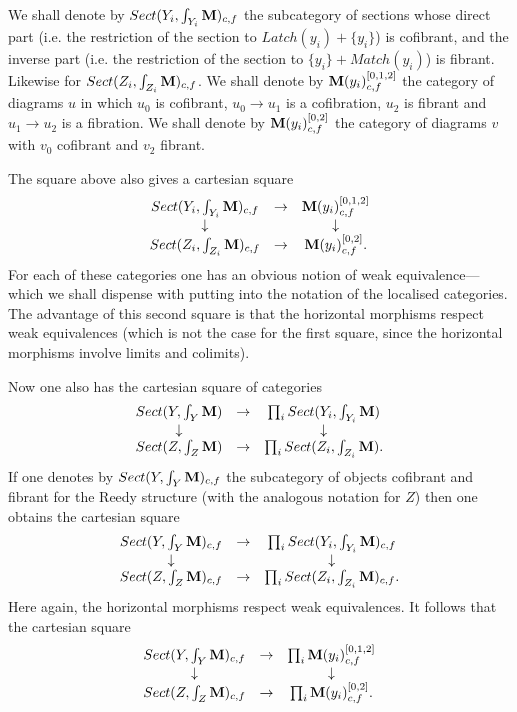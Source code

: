 We shall denote by $Sect (Y_i,\int _{Y_i}{\bf M} )_{c,f}$ the subcategory of
sections
whose direct part (i.e. the restriction of the section to $Latch(y_i)+\{
y_i\}$) is cofibrant, and the inverse part (i.e. the restriction of the
section
to $\{ y_i\} +Match(y_i)$) is fibrant. Likewise for
$Sect (Z_i,\int _{Z_i}{\bf M} )_{c,f}$. We shall denote by ${\bf M} (y_i) ^{[0,1,2]}_{c,f}$
the category of diagrams $u$ in which
$u_0$ is cofibrant, $u_0\rightarrow u_1$ is
a cofibration, $u_2$ is fibrant and $u_1\rightarrow u_2$
is a fibration. We
shall denote by ${\bf M} (y_i) ^{[0,2]}_{c,f}$ the category of diagrams $v$ with
$v_0$
cofibrant and $v_2$ fibrant.

The square above also gives a cartesian square
$$
\begin{array}{ccc}
Sect (Y_i,\int _{Y_i}{\bf M} ) _{c,f}& \rightarrow & {\bf M} (y_i) ^{[0,1,2]} _{c,f}\\
\downarrow && \downarrow \\
Sect (Z_i,\int _{Z_i}{\bf M} )  _{c,f}& \rightarrow & {\bf M} (y_i) ^{[0,2]} _{c,f}.
\end{array}
$$
For each of these categories one has an obvious notion of weak
equivalence---which we shall dispense with putting into the notation of the
localised categories. The advantage
of this second square is that the horizontal morphisms respect
weak equivalences (which is not the case for the first square,
since the
horizontal morphisms involve limits and colimits).

Now one also has the cartesian square of categories
$$
\begin{array}{ccc}
Sect (Y,\int _{Y}{\bf M} )& \rightarrow & \prod _iSect (Y_i,\int _{Y_i}{\bf M} )
\\ \downarrow && \downarrow \\
Sect (Z,\int _{Z}{\bf M} ) & \rightarrow &
\prod _i Sect (Z_i,\int _{Z_i}{\bf M} ).
\end{array}
$$
If one denotes by $Sect (Y,\int _{Y}{\bf M} )_{c,f}$ the subcategory of objects
cofibrant and fibrant for the Reedy structure
(with the analogous notation for
$Z$) then one obtains the cartesian square
$$
\begin{array}{ccc}
Sect (Y,\int _{Y}{\bf M} ) _{c,f}& \rightarrow & \prod _iSect (Y_i,\int _{Y_i}{\bf M} )
_{c,f}
\\ \downarrow && \downarrow \\
Sect (Z,\int _{Z}{\bf M} )  _{c,f}& \rightarrow &
\prod _i Sect (Z_i,\int _{Z_i}{\bf M} )  _{c,f}.
\end{array}
$$
Here again, the horizontal morphisms respect weak equivalences.
It follows that the cartesian square
$$
\begin{array}{ccc}
Sect (Y,\int _{Y}{\bf M} ) _{c,f}& \rightarrow & \prod _i {\bf M} (y_i) ^{[0,1,2]}
_{c,f}\\ \downarrow && \downarrow \\
Sect (Z,\int _{Z}{\bf M} )  _{c,f}& \rightarrow & \prod _i{\bf M} (y_i) ^{[0,2]} _{c,f}.
\end{array}
$$

